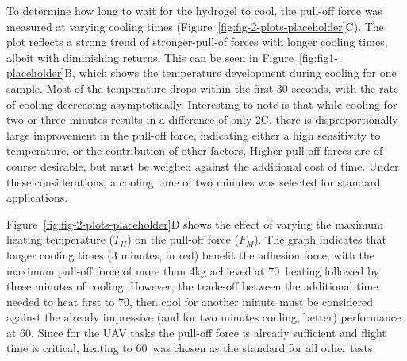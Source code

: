 To determine how long to wait for the hydrogel to cool, the pull-off force was measured at varying cooling times (Figure~\ref{fig:fig-2-plots-placeholder}C).
The plot reflects a strong trend of stronger-pull-of forces with longer cooling times, albeit with diminishing returns. 
This can be seen in Figure~\ref{fig:fig1-placeholder}B, which shows the temperature development during cooling for one sample. Most of the temperature drops within the first 30 seconds, with the rate of cooling decreasing asymptotically. 
Interesting to note is that while cooling for two or three minutes results in a difference of only 2\degree C, there is disproportionally large improvement in the pull-off force, indicating either a high sensitivity to temperature, or the contribution of other factors.
Higher pull-off forces are of course desirable, but must be weighed against the additional cost of time.
Under these considerations, a cooling time of two minutes was selected for standard applications.

Figure~\ref{fig:fig-2-plots-placeholder}D shows the effect of varying the maximum heating temperature ($T_H$) on the pull-off force ($F_M$). The graph indicates that longer cooling times (3 minutes, in red) benefit the adhesion force, with the maximum pull-off force of more than 4kg achieved at 70\degree\, heating followed by three minutes of cooling. However, the trade-off between the additional time needed to heat first to 70\degree, then cool for another minute must be considered against  the already impressive (and for two minutes cooling, better) performance at 60\degree. Since for the UAV tasks the pull-off force is already sufficient and flight time is critical, heating to 60\degree\, was chosen as the standard for all other tests.

